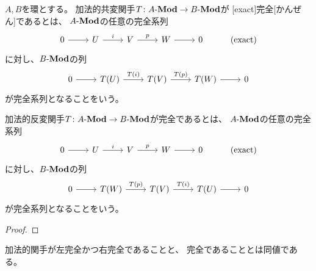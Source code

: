 \documentclass[report]{jlreq}
\begin{document}
\begin{definition}[完全関手]
    $A, B$を環とする。
    加法的共変関手$T \colon A\text{-}\mathbf{Mod} \to B\text{-}\mathbf{Mod}$が
    [exact]{完全}[かんぜん]であるとは、
    $A\text{-}\mathbf{Mod}$の任意の完全系列
    \begin{equation}
        \begin{tikzcd}
            0 \ar{r}
                & U \ar{r}{i}
                & V \ar{r}{p}
                & W \ar{r}
                & 0
                & (\text{exact})
        \end{tikzcd}
    \end{equation}
    に対し、$B\text{-}\mathbf{Mod}$の列
    \begin{equation}
        \begin{tikzcd}
            0 \ar{r}
                & T(U) \ar{r}{T(i)}
                & T(V) \ar{r}{T(p)}
                & T(W) \ar{r}
                & 0
        \end{tikzcd}
    \end{equation}
    が完全系列となることをいう。

    加法的反変関手$T \colon A\text{-}\mathbf{Mod} \to B\text{-}\mathbf{Mod}$が完全であるとは、
    $A\text{-}\mathbf{Mod}$の任意の完全系列
    \begin{equation}
        \begin{tikzcd}
            0 \ar{r}
                & U \ar{r}{i}
                & V \ar{r}{p}
                & W \ar{r}
                & 0
                & (\text{exact})
        \end{tikzcd}
    \end{equation}
    に対し、$B\text{-}\mathbf{Mod}$の列
    \begin{equation}
        \begin{tikzcd}
            0 \ar{r}
                & T(W) \ar{r}{T(p)}
                & T(V) \ar{r}{T(i)}
                & T(U) \ar{r}
                & 0
        \end{tikzcd}
    \end{equation}
    が完全系列となることをいう。
\end{definition}

\begin{theorem}[完全関手は完全系列を完全系列に写す]
    \TODO{}
\end{theorem}

\begin{proof}
    \TODO{}
\end{proof}

\begin{corollary}
    加法的関手が左完全かつ右完全であることと、
    完全であることとは同値である。
\end{corollary}
\end{document}

